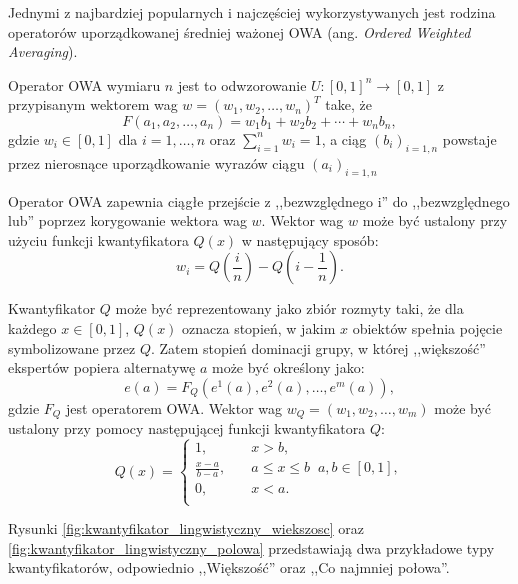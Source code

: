 Jednymi z najbardziej popularnych i najczęściej wykorzystywanych jest rodzina
operatorów uporządkowanej średniej ważonej OWA (ang. \textit{Ordered Weighted
Averaging}).

\begin{definition}
Operator OWA wymiaru $n$ jest to odwzorowanie $U : [0,1]^n \rightarrow [0,1]$
z przypisanym wektorem wag $w=(w_1,w_2,\dotsc,w_n)^T$ take, że
\begin{equation}
F(a_1,a_2,\dotsc,a_n) = w_1b_1 + w_2b_2 + \dotsb + w_nb_n,
\end{equation}
gdzie $w_i \in [0,1]$ dla $i=1,\dotsc, n$ oraz $\sum_{i=1}^{n} w_i = 1$, a ciąg
$(b_i)_{i=1,n}$ powstaje przez nierosnące uporządkowanie wyrazów ciągu
$(a_i)_{i=1,n}$
\end{definition}

Operator OWA zapewnia ciągłe przejście z ,,bezwzględnego i'' do ,,bezwzględnego
lub'' poprzez korygowanie wektora wag $w$. Wektor wag $w$ może być ustalony przy
użyciu funkcji kwantyfikatora $Q(x)$ w następujący sposób:
$$w_i = Q(\frac{i}{n}) - Q(i - \frac{1}{n}).$$

Kwantyfikator $Q$ może być reprezentowany jako zbiór rozmyty taki, że dla
każdego $x \in [0,1]$, $Q(x)$ oznacza stopień, w jakim $x$ obiektów spełnia
pojęcie symbolizowane przez $Q$. Zatem stopień dominacji grupy, w której
,,większość'' ekspertów popiera alternatywę $a$ może być określony jako:
$$e(a) = F_Q(e^1(a),e^2(a),\dotsc,e^m(a)),$$
gdzie $F_Q$ jest operatorem OWA. Wektor wag $w_Q = (w_1,w_2,\dotsc,w_m)$ może
być ustalony przy pomocy następującej funkcji kwantyfikatora $Q$:
$$
Q(x) = 
\left\{ 
	\begin{array}{cl}
	  1	,				& \quad  x > b, \\
      \frac{x-a}{b-a}, 	& \quad  a \leq x \leq b \;\; a,b \in [0,1], \\
      0 ,				& \quad  x < a. \\
  	\end{array} 
  \right.
$$

Rysunki \ref{fig:kwantyfikator_lingwistyczny_wiekszosc} oraz
\ref{fig:kwantyfikator_lingwistyczny_polowa} przedstawiają dwa przykładowe typy
kwantyfikatorów, odpowiednio ,,Większość'' oraz ,,Co najmniej połowa''.

